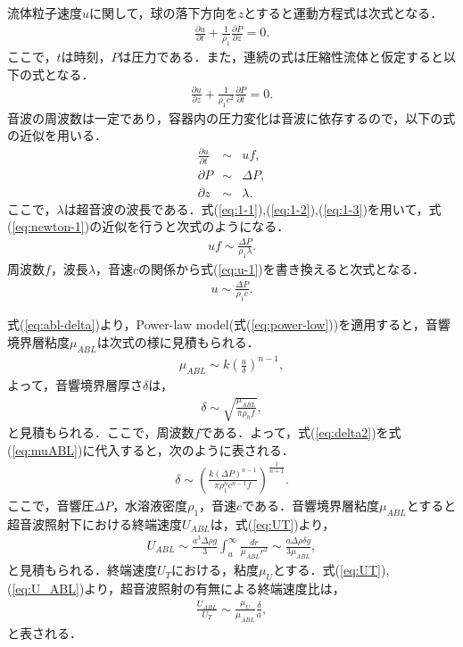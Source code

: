 流体粒子速度$u$に関して，球の落下方向を$z$とすると運動方程式は次式となる．
\begin{eqnarray}
    \frac{\partial u}{\partial t} + \frac{1}{\rho_1}\frac{\partial P}{\partial z} = 0 .
    \label{eq:newton-1}
\end{eqnarray}
ここで，$t$は時刻，$P$は圧力である．また，連続の式は圧縮性流体と仮定すると以下の式となる．
\begin{eqnarray}
    \frac{\partial u}{\partial z} + \frac{1}{\rho_1 c^2}\frac{\partial P}{\partial t} = 0 .
\end{eqnarray}
音波の周波数は一定であり，容器内の圧力変化は音波に依存するので，以下の式の近似を用いる．
\begin{eqnarray}
    \frac{\partial u}{\partial t} &\sim& uf ,\label{eq:1-1}\\
    \partial P &\sim& \Delta P ,\label{eq:1-2}\\
    \partial z &\sim& \lambda .\label{eq:1-3}
\end{eqnarray}
ここで，$\lambda$は超音波の波長である．式(\ref{eq:1-1}),(\ref{eq:1-2}),(\ref{eq:1-3})を用いて，式(\ref{eq:newton-1})の近似を行うと次式のようになる．
\begin{eqnarray}
    uf \sim \frac{\Delta P}{\rho_1 \lambda} .
    \label{eq:u-1}
\end{eqnarray}
周波数$f$，波長$\lambda$，音速$c$の関係から式(\ref{eq:u-1})を書き換えると次式となる．
\begin{eqnarray}
    u \sim \frac{\Delta P}{\rho_1 c} .
\end{eqnarray}

式(\ref{eq:abl-delta})より，Power-law model(式(\ref{eq:power-low}))を適用すると，音響境界層粘度$\mu_{ABL}$は次式の様に見積もられる．
\begin{eqnarray}
    \mu_{ABL} \sim k\left(\frac{u}{\delta}\right)^{n-1} ,
    \label{eq:muABL}
\end{eqnarray}
よって，音響境界層厚さ$\delta$は，
\begin{eqnarray}
    \delta \sim \sqrt{\frac{\mu_{ABL}}{\pi \rho_h f}} ,
    \label{eq:delta2}
\end{eqnarray}
と見積もられる\cite{deshpande2001vibrational,wiklund2012acoustofluidics}．ここで，周波数$f$である．よって，式(\ref{eq:delta2})を式(\ref{eq:muABL})に代入すると，次のように表される．
\begin{eqnarray}
    \delta \sim \left(\frac{k\left(\Delta P\right)^{n-1}}{\pi \rho^n_1 c^{n-1} f}\right)^{\frac{1}{n+1}} .
    \label{eq:delta}
\end{eqnarray}
ここで，音響圧$\Delta P$，水溶液密度$\rho_1$，音速$c$である．音響境界層粘度$\mu_{ABL}$とすると超音波照射下における終端速度$U_{ABL}$は，式(\ref{eq:UT})より，
\begin{eqnarray}
    U_{ABL} \sim \frac{a^3\Delta\rho g}{3}  \int^{\infty}_{a} \frac{dr}{\mu_{ABL} r^2} \sim \frac{a\Delta \rho \delta g}{3\mu_{ABL}} ,
    \label{eq:U_ABL}
\end{eqnarray}
と見積もられる．終端速度$U_T$における，粘度$\mu_U$とする．式(\ref{eq:UT}),(\ref{eq:U_ABL})より，超音波照射の有無による終端速度比は，
\begin{eqnarray}
    \frac{U_{ABL}}{U_T} \sim \frac{\mu_U}{\mu_{ABL}}\frac{\delta}{a} ,
    \label{eq:Udiff}
\end{eqnarray}
と表される．
